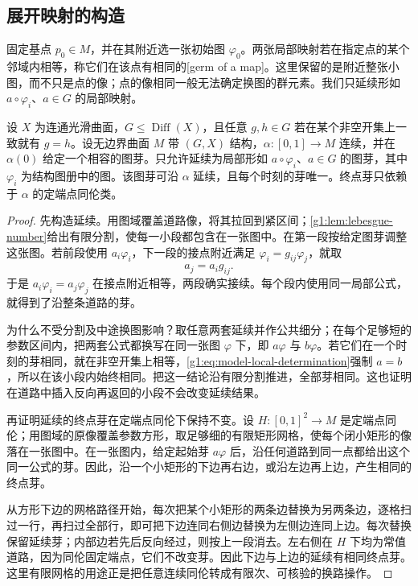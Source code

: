 \subsection{展开映射的构造}
\label{g1:subsec:1003:02}

固定基点 \(p_0\in M\)，并在其附近选一张初始图 \(\varphi_0\)。两张局部映射若在指定点的某个邻域内相等，称它们在该点有相同的[germ of a map]。这里保留的是附近整张小图，而不只是点的像；点的像相同一般无法确定换图的群元素。我们只延续形如 \(a\circ\varphi_i\)、\(a\in G\) 的局部映射。

\begin{lemma}
	\label{g1:lem:chart-continuation}
	设 \(X\) 为连通光滑曲面，\(G\le\operatorname{Diff}(X)\)，且任意 \(g,h\in G\) 若在某个非空开集上一致就有 \(g=h\)。设无边界曲面 \(M\) 带 \((G,X)\) 结构，\(\alpha:[0,1]\to M\) 连续，并在 \(\alpha(0)\) 给定一个相容的图芽。只允许延续为局部形如 \(a\circ\varphi_i\)、\(a\in G\) 的图芽，其中 \(\varphi_i\) 为结构图册中的图。该图芽可沿 \(\alpha\) 延续，且每个时刻的芽唯一。终点芽只依赖于 \(\alpha\) 的定端点同伦类。
\end{lemma}
\begin{proof}
	先构造延续。用图域覆盖道路像，将其拉回到紧区间；\cref{g1:lem:lebesgue-number}给出有限分割，使每一小段都包含在一张图中。在第一段按给定图芽调整这张图。若前段使用 \(a_i\varphi_i\)，下一段的接点附近满足 \(\varphi_i=g_{ij}\varphi_j\)，就取
	\[
		a_j=a_i g_{ij}.
	\]
	于是 \(a_i\varphi_i=a_j\varphi_j\) 在接点附近相等，两段确实接续。每个段内使用同一局部公式，就得到了沿整条道路的芽。

	为什么不受分割及中途换图影响？取任意两套延续并作公共细分；在每个足够短的参数区间内，把两套公式都换写在同一张图 \(\varphi\) 下，即 \(a\varphi\) 与 \(b\varphi\)。若它们在一个时刻的芽相同，就在非空开集上相等，\eqref{g1:eq:model-local-determination}强制 \(a=b\)，所以在该小段内始终相同。把这一结论沿有限分割推进，全部芽相同。这也证明在道路中插入反向再返回的小段不会改变延续结果。

	再证明延续的终点芽在定端点同伦下保持不变。设 \(H:[0,1]^2\to M\) 是定端点同伦；用图域的原像覆盖参数方形，取足够细的有限矩形网格，使每个闭小矩形的像落在一张图中。在一张图内，给定起始芽 \(a\varphi\) 后，沿任何道路到同一点都给出这个同一公式的芽。因此，沿一个小矩形的下边再右边，或沿左边再上边，产生相同的终点芽。

	从方形下边的网格路径开始，每次把某个小矩形的两条边替换为另两条边，逐格扫过一行，再扫过全部行，即可把下边连同右侧边替换为左侧边连同上边。每次替换保留延续芽；内部边若先后反向经过，则按上一段消去。左右侧在 \(H\) 下均为常值道路，因为同伦固定端点，它们不改变芽。因此下边与上边的延续有相同终点芽。这里有限网格的用途正是把任意连续同伦转成有限次、可核验的换路操作。
\end{proof}

